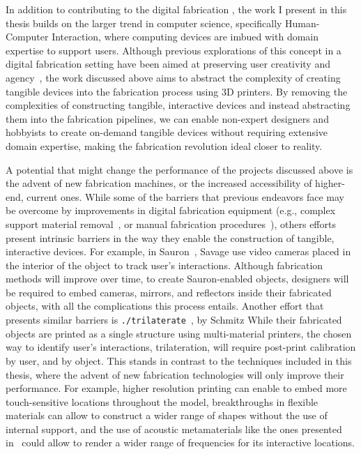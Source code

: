     In addition to contributing to the digital fabrication , the work
    I present in this thesis builds on the larger trend in computer science,
    specifically Human-Computer Interaction, where computing devices are imbued
    with domain expertise to support users. Although previous explorations of
    this concept in a digital fabrication setting have been aimed at preserving
    user creativity and agency~\cite{Zoran:2013}, the work discussed above aims
    to abstract the complexity of creating tangible devices into the fabrication
    process using 3D printers. By removing the complexities of constructing
    tangible, interactive devices and instead abstracting them into the
    fabrication pipelines, we can enable non-expert designers and hobbyists to
    create on-demand tangible devices without requiring extensive domain
    expertise, making the fabrication revolution ideal closer to reality.

    A potential  that might change the performance of the
    projects discussed above is the advent of new fabrication machines, or the
    increased accessibility of higher-end, current ones. While some of the
    barriers that previous endeavors face may be overcome by improvements in
    digital fabrication equipment (e.g., complex support material
    removal~\cite{Laput:2015}, or manual fabrication procedures~\cite{He:2017}),
    others efforts present intrinsic barriers in the way they enable the
    construction of tangible, interactive devices. For example, in
    Sauron~\cite{Savage:2013}, Savage \etal use video cameras placed in the
    interior of the object to track user's interactions.  Although fabrication
    methods will improve over time, to create Sauron-enabled objects, designers
    will be required to embed cameras, mirrors, and reflectors inside their
    fabricated objects, with all the complications this process entails. Another
    effort that presents similar barriers is
    \texttt{./trilaterate}~\cite{Schmitz:2019}, by Schmitz \etal While their
    fabricated objects are printed as a single structure using multi-material
    printers, the chosen way to identify user's interactions, trilateration,
    will require post-print calibration by user, and by object. This stands in
    contrast to the techniques included in this thesis, where the advent of new
    fabrication technologies will only improve their performance. For example,
    higher resolution printing can enable \at to embed more touch-sensitive
    locations throughout the model, breakthroughs in flexible materials can
    allow \mp to construct a wider range of shapes without the use of internal
    support, and the use of acoustic metamaterials like the ones presented
    in~\cite{Haberman:2016} could allow \bh to render a wider range of
    frequencies for its interactive locations.

